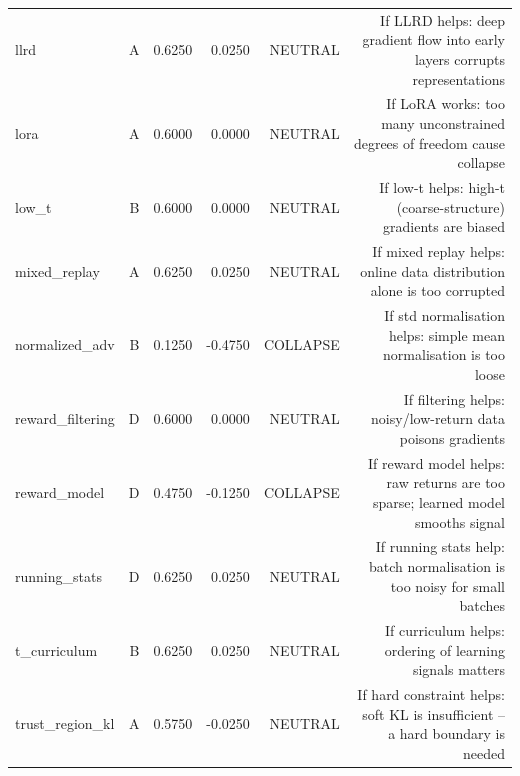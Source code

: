 \begin{table}[htbp]
\begin{tabular}{lrrrrr}
llrd & A & 0.6250 & 0.0250 & NEUTRAL & If LLRD helps: deep gradient flow into early layers corrupts representations \\
lora & A & 0.6000 & 0.0000 & NEUTRAL & If LoRA works: too many unconstrained degrees of freedom cause collapse \\
low\_t & B & 0.6000 & 0.0000 & NEUTRAL & If low-t helps: high-t (coarse-structure) gradients are biased \\
mixed\_replay & A & 0.6250 & 0.0250 & NEUTRAL & If mixed replay helps: online data distribution alone is too corrupted \\
normalized\_adv & B & 0.1250 & -0.4750 & COLLAPSE & If std normalisation helps: simple mean normalisation is too loose \\
reward\_filtering & D & 0.6000 & 0.0000 & NEUTRAL & If filtering helps: noisy/low-return data poisons gradients \\
reward\_model & D & 0.4750 & -0.1250 & COLLAPSE & If reward model helps: raw returns are too sparse; learned model smooths signal \\
running\_stats & D & 0.6250 & 0.0250 & NEUTRAL & If running stats help: batch normalisation is too noisy for small batches \\
t\_curriculum & B & 0.6250 & 0.0250 & NEUTRAL & If curriculum helps: ordering of learning signals matters \\
trust\_region\_kl & A & 0.5750 & -0.0250 & NEUTRAL & If hard constraint helps: soft KL is insufficient -- a hard boundary is needed \\
\bottomrule
\end{tabular}
\end{table}